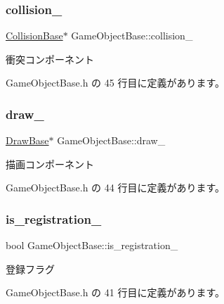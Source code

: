 \subsubsection{\texorpdfstring{collision\+\_\+}{collision\_}}
{\footnotesize\ttfamily \mbox{\hyperlink{class_collision_base}{Collision\+Base}}$\ast$ Game\+Object\+Base\+::collision\+\_\+\hspace{0.3cm}{\ttfamily [private]}}



衝突コンポーネント 



 Game\+Object\+Base.\+h の 45 行目に定義があります。

\mbox{\label{class_game_object_base_af98b5356a668abe576a0d20a37f26e03}} 
\subsubsection{\texorpdfstring{draw\+\_\+}{draw\_}}
{\footnotesize\ttfamily \mbox{\hyperlink{class_draw_base}{Draw\+Base}}$\ast$ Game\+Object\+Base\+::draw\+\_\+\hspace{0.3cm}{\ttfamily [private]}}



描画コンポーネント 



 Game\+Object\+Base.\+h の 44 行目に定義があります。

\mbox{\label{class_game_object_base_a1118bad7222ee50ff135e3eddbe5b1b4}} 
\subsubsection{\texorpdfstring{is\+\_\+registration\+\_\+}{is\_registration\_}}
{\footnotesize\ttfamily bool Game\+Object\+Base\+::is\+\_\+registration\+\_\+\hspace{0.3cm}{\ttfamily [private]}}



登録フラグ 



 Game\+Object\+Base.\+h の 41 行目に定義があります。

